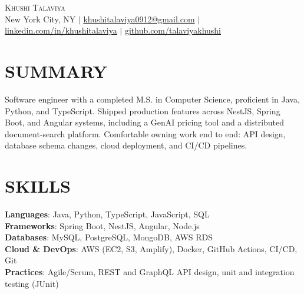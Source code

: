 \documentclass[letterpaper,11pt]{article}
\begin{document}
\begin{center}
    {\Huge \scshape Khushi Talaviya} \\ \vspace{2pt}
    \vspace{4pt}
    \small
    New York City, NY $|$
    \href{mailto:khushitalaviya0912@gmail.com}{khushitalaviya0912@gmail.com} $|$
    \href{https://www.linkedin.com/in/khushitalaviya/}{linkedin.com/in/khushitalaviya} $|$
    \href{https://github.com/talaviyakhushi}{github.com/talaviyakhushi}
\end{center}

\section{SUMMARY}
\vspace{5pt}
\small{Software engineer with a completed M.S. in Computer Science, proficient in Java, Python, and TypeScript. Shipped production features across NestJS, Spring Boot, and Angular systems, including a GenAI pricing tool and a distributed document-search platform. Comfortable owning work end to end: API design, database schema changes, cloud deployment, and CI/CD pipelines.}

\vspace{2pt}
\section{SKILLS}
\vspace{5pt}
\begin{itemize}[leftmargin=0in, label={}]
\small{\item{
\textbf{Languages}{: Java, Python, TypeScript, JavaScript, SQL} \\
\textbf{Frameworks}{: Spring Boot, NestJS, Angular, Node.js} \\
\textbf{Databases}{: MySQL, PostgreSQL, MongoDB, AWS RDS} \\
\textbf{Cloud \& DevOps}{: AWS (EC2, S3, Amplify), Docker, GitHub Actions, CI/CD, Git} \\
\textbf{Practices}{: Agile/Scrum, REST and GraphQL API design, unit and integration testing (JUnit)}
}}
\end{itemize}
\vspace{-10pt}

\end{document}

